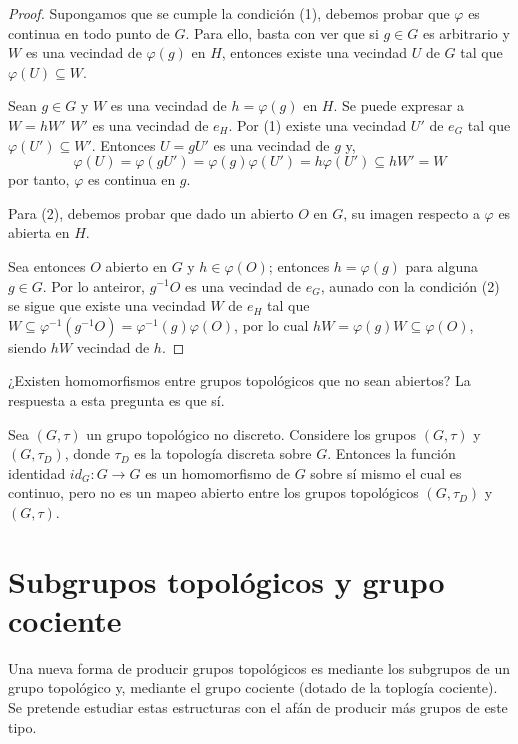 \documentclass[12pt]{report}
\theoremstyle{largebreak}
\newcommand{\cf}[3]{\ensuremath{#1:#2\rightarrow#3}}
\begin{document}
    \begin{proof}
        Supongamos que se cumple la condición (1), debemos probar que $\varphi$ es continua en todo punto de $G$. Para ello, basta con ver que si $g\in G$ es arbitrario y $W$ es una vecindad de $\varphi(g)$ en $H$, entonces existe una vecindad $U$ de $G$ tal que $\varphi(U)\subseteq W$.

        Sean $g\in G$ y $W$ es una vecindad de $h=\varphi(g)$ en $H$. Se puede expresar a $W=hW'$ $W'$ es una vecindad de $e_H$. Por (1) existe una vecindad $U'$ de $e_G$ tal que $\varphi(U')\subseteq W'$. Entonces $U=gU'$ es una vecindad de $g$ y,
        \begin{equation*}
            \varphi(U)=\varphi(gU')=\varphi(g)\varphi(U')=h\varphi(U')\subseteq hW'=W
        \end{equation*}
        por tanto, $\varphi$ es continua en $g$.

        Para (2), debemos probar que dado un abierto $O$ en $G$, su imagen respecto a $\varphi$ es abierta en $H$.

        Sea entonces $O$ abierto en $G$ y $h\in\varphi(O)$; entonces $h=\varphi(g)$ para alguna $g\in G$. Por lo anteiror, $g^{-1}O$ es una vecindad de $e_G$, aunado con la condición (2) se sigue que existe una vecindad $W$ de $e_H$ tal que $W\subseteq \varphi^{-1}(g^{-1}O)=\varphi^{-1}(g)\varphi(O)$, por lo cual $hW=\varphi(g)W\subseteq\varphi(O)$, siendo $hW$ vecindad de $h$.
    \end{proof}

    ¿Existen homomorfismos entre grupos topológicos que no sean abiertos? La respuesta a esta pregunta es que sí.

    \begin{exa}
        Sea $(G,\tau)$ un grupo topológico no discreto. Considere los grupos $(G,\tau)$ y $(G,\tau_D)$, donde $\tau_D$ es la topología discreta sobre $G$. Entonces la función identidad $\cf{id_G}{G}{G}$ es un homomorfismo de $G$ sobre sí mismo el cual es continuo, pero no es un mapeo abierto entre los grupos topológicos $(G,\tau_D)$ y $(G,\tau)$.
    \end{exa}

    \section{Subgrupos topológicos y grupo cociente}
    
    Una nueva forma de producir grupos topológicos es mediante los subgrupos de un grupo topológico y, mediante el grupo cociente (dotado de la toplogía cociente). Se pretende estudiar estas estructuras con el afán de producir más grupos de este tipo.
\end{document}
